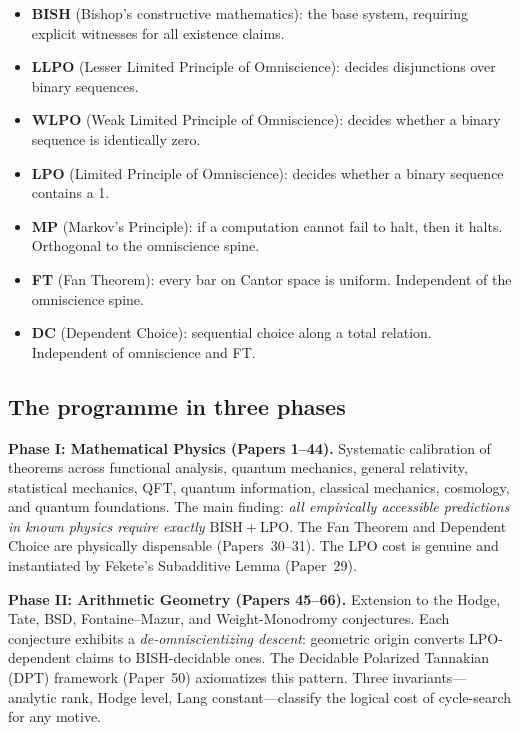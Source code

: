 \documentclass[11pt,a4paper]{article}
\begin{document}
\begin{itemize}[nosep]
\item \textbf{BISH} (Bishop's constructive mathematics): the base system, requiring explicit witnesses for all existence claims.
\item \textbf{LLPO} (Lesser Limited Principle of Omniscience): decides disjunctions over binary sequences.
\item \textbf{WLPO} (Weak Limited Principle of Omniscience): decides whether a binary sequence is identically zero.
\item \textbf{LPO} (Limited Principle of Omniscience): decides whether a binary sequence contains a 1.
\item \textbf{MP} (Markov's Principle): if a computation cannot fail to halt, then it halts. Orthogonal to the omniscience spine.
\item \textbf{FT} (Fan Theorem): every bar on Cantor space is uniform.  Independent of the omniscience spine.
\item \textbf{DC} (Dependent Choice): sequential choice along a total relation.  Independent of omniscience and FT.
\end{itemize}

\subsection*{The programme in three phases}

\textbf{Phase I: Mathematical Physics (Papers 1--44).}  Systematic calibration of theorems across functional analysis, quantum mechanics, general relativity, statistical mechanics, QFT, quantum information, classical mechanics, cosmology, and quantum foundations.  The main finding: \emph{all empirically accessible predictions in known physics require exactly $\mathrm{BISH{+}LPO}$}.  The Fan Theorem and Dependent Choice are physically dispensable (Papers~30--31).  The LPO cost is genuine and instantiated by Fekete's Subadditive Lemma (Paper~29).

\textbf{Phase II: Arithmetic Geometry (Papers 45--66).}  Extension to the Hodge, Tate, BSD, Fontaine--Mazur, and Weight-Monodromy conjectures.  Each conjecture exhibits a \emph{de-omniscientizing descent}: geometric origin converts LPO-dependent claims to BISH-decidable ones.  The Decidable Polarized Tannakian (DPT) framework (Paper~50) axiomatizes this pattern.  Three invariants---analytic rank, Hodge level, Lang constant---classify the logical cost of cycle-search for any motive.
\end{document}
